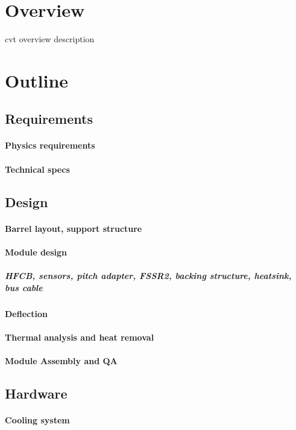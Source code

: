 \section{Overview}
cvt overview description \cite{einstein}

\section{Outline}
\subsection{Requirements} 
\paragraph{Physics requirements} 
\paragraph{Technical specs} 
\subsection{Design}
\paragraph{Barrel layout, support structure}
\paragraph{Module design}
\subparagraph{HFCB, sensors, pitch adapter, FSSR2, backing structure, heatsink, bus cable}
\paragraph{Deflection}
\paragraph{Thermal analysis and heat removal}
\paragraph{Module Assembly and QA}
\subsection{Hardware}
\paragraph{Cooling system}
